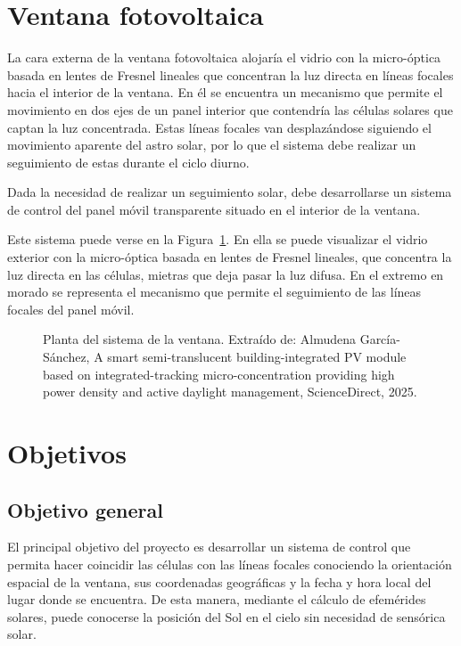 \section{Ventana fotovoltaica}

La cara externa de la ventana fotovoltaica alojaría el vidrio con la micro-óptica basada en lentes de Fresnel lineales que concentran la luz directa en líneas focales hacia el interior de la ventana. En él se encuentra un mecanismo que permite el movimiento en dos ejes de un panel interior que contendría las células solares que captan la luz concentrada. Estas líneas focales van desplazándose siguiendo el movimiento aparente del astro solar, por lo que el sistema debe realizar un seguimiento de estas durante el ciclo diurno.

Dada la necesidad de realizar un seguimiento solar, debe desarrollarse un sistema de control del panel móvil transparente situado en el interior de la ventana. 

Este sistema puede verse en la Figura~\ref{fig:representacion}. En ella se puede visualizar el vidrio exterior con la micro-óptica basada en lentes de Fresnel lineales, que concentra la luz directa en las células, mietras que deja pasar la luz difusa. En el extremo en morado se representa el mecanismo que permite el seguimiento de las líneas focales del panel móvil.

\begin{figure}
	\centering
	
	\caption{Planta del sistema de la ventana. Extraído de: Almudena García-Sánchez, A smart semi-translucent building-integrated PV module based on integrated-tracking micro-concentration providing high power density and active daylight management, ScienceDirect, 2025.}
	\label{fig:representacion}
\end{figure}

\section{Objetivos}

\subsection{Objetivo general}

El principal objetivo del proyecto es desarrollar un sistema de control que permita hacer coincidir las células con las líneas focales conociendo la orientación espacial de la ventana, sus coordenadas geográficas y la fecha y hora local del lugar donde se encuentra. De esta manera, mediante el cálculo de efemérides solares, puede conocerse la posición del Sol en el cielo sin necesidad de sensórica solar. 

